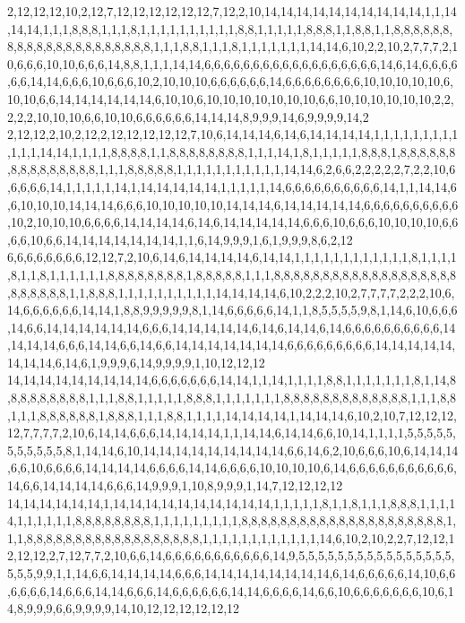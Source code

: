 2,12,12,12,10,2,12,7,12,12,12,12,12,12,7,12,2,10,14,14,14,14,14,14,14,14,14,14,1,1,14,14,14,1,1,1,8,8,8,1,1,1,8,1,1,1,1,1,1,1,1,1,1,8,8,1,1,1,1,1,8,8,8,1,1,8,8,1,1,8,8,8,8,8,8,8,8,8,8,8,8,8,8,8,8,8,8,8,8,8,1,1,1,8,8,1,1,1,8,1,1,1,1,1,1,1,14,14,6,10,2,2,10,2,7,7,7,2,10,6,6,6,10,10,6,6,6,14,8,8,1,1,1,14,14,6,6,6,6,6,6,6,6,6,6,6,6,6,6,6,6,6,6,14,6,14,6,6,6,6,6,6,14,14,6,6,6,10,6,6,6,10,2,10,10,10,6,6,6,6,6,6,14,6,6,6,6,6,6,6,6,10,10,10,10,10,6,10,10,6,6,14,14,14,14,14,14,6,10,10,6,10,10,10,10,10,10,10,6,6,10,10,10,10,10,10,2,2,2,2,2,10,10,10,6,6,10,10,6,6,6,6,6,6,14,14,14,8,9,9,9,14,6,9,9,9,9,14,2
2,12,12,2,10,2,12,2,12,12,12,12,12,7,10,6,14,14,14,6,14,6,14,14,14,14,1,1,1,1,1,1,1,1,1,1,1,1,14,14,1,1,1,1,8,8,8,8,1,1,8,8,8,8,8,8,8,8,1,1,1,14,1,8,1,1,1,1,1,8,8,8,1,8,8,8,8,8,8,8,8,8,8,8,8,8,8,8,1,1,1,8,8,8,8,8,1,1,1,1,1,1,1,1,1,1,1,14,14,6,2,6,6,2,2,2,2,2,7,2,2,10,6,6,6,6,6,14,1,1,1,1,1,14,1,14,14,14,14,14,1,1,1,1,1,14,6,6,6,6,6,6,6,6,6,6,14,1,1,14,14,6,6,10,10,10,14,14,14,6,6,6,10,10,10,10,10,14,14,14,6,14,14,14,14,14,6,6,6,6,6,6,6,6,6,6,10,2,10,10,10,6,6,6,6,14,14,14,14,6,14,6,14,14,14,14,14,6,6,6,10,6,6,6,10,10,10,10,6,6,6,6,10,6,6,14,14,14,14,14,14,14,1,1,6,14,9,9,9,1,6,1,9,9,9,8,6,2,12
6,6,6,6,6,6,6,6,12,12,7,2,10,6,14,6,14,14,14,14,6,14,14,1,1,1,1,1,1,1,1,1,1,1,1,8,1,1,1,1,8,1,1,8,1,1,1,1,1,1,8,8,8,8,8,8,8,8,1,8,8,8,8,8,1,1,1,8,8,8,8,8,8,8,8,8,8,8,8,8,8,8,8,8,8,8,8,8,8,8,8,8,1,1,8,8,8,1,1,1,1,1,1,1,1,1,1,14,14,14,14,6,10,2,2,2,10,2,7,7,7,7,2,2,2,10,6,14,6,6,6,6,6,6,14,14,1,8,8,9,9,9,9,9,8,1,14,6,6,6,6,6,14,1,1,8,5,5,5,5,9,8,1,14,6,10,6,6,6,14,6,6,14,14,14,14,14,14,6,6,6,14,14,14,14,14,6,14,6,14,14,6,14,6,6,6,6,6,6,6,6,6,6,14,14,14,14,6,6,6,14,14,6,6,14,6,6,14,14,14,14,14,14,14,6,6,6,6,6,6,6,6,6,14,14,14,14,14,14,14,14,6,14,6,1,9,9,9,6,14,9,9,9,9,1,10,12,12,12
14,14,14,14,14,14,14,14,14,6,6,6,6,6,6,6,14,14,1,1,14,1,1,1,1,8,8,1,1,1,1,1,1,1,8,1,14,8,8,8,8,8,8,8,8,8,1,1,1,8,8,1,1,1,1,1,8,8,8,1,1,1,1,1,1,1,8,8,8,8,8,8,8,8,8,8,8,8,8,1,1,1,8,8,1,1,1,8,8,8,8,8,8,1,8,8,8,1,1,1,8,8,1,1,1,1,14,14,14,14,1,14,14,14,6,10,2,10,7,12,12,12,12,7,7,7,7,2,10,6,14,14,6,6,6,14,14,14,14,1,1,14,14,6,14,14,6,6,10,14,1,1,1,1,5,5,5,5,5,5,5,5,5,5,5,8,1,14,14,6,10,14,14,14,14,14,14,14,14,14,6,6,14,6,2,10,6,6,6,10,6,14,14,14,6,6,10,6,6,6,6,14,14,14,14,6,6,6,6,14,14,6,6,6,6,10,10,10,10,6,14,6,6,6,6,6,6,6,6,6,6,6,14,6,6,14,14,14,14,6,6,6,14,9,9,9,1,10,8,9,9,9,1,14,7,12,12,12,12
14,14,14,14,14,14,1,14,14,14,14,14,14,14,14,14,14,1,1,1,1,1,8,1,1,8,1,1,1,8,8,8,1,1,1,14,1,1,1,1,1,1,8,8,8,8,8,8,8,8,1,1,1,1,1,1,1,1,1,8,8,8,8,8,8,8,8,8,8,8,8,8,8,8,8,8,8,8,8,8,1,1,1,8,8,8,8,8,8,8,8,8,8,8,8,8,8,8,8,8,8,1,1,1,1,1,1,1,1,1,1,1,1,14,6,10,2,10,2,2,7,12,12,12,12,12,2,7,12,7,7,2,10,6,6,14,6,6,6,6,6,6,6,6,6,6,6,14,9,5,5,5,5,5,5,5,5,5,5,5,5,5,5,5,5,5,5,5,9,9,1,1,14,6,6,14,14,14,14,6,6,6,14,14,14,14,14,14,14,14,6,14,6,6,6,6,6,14,10,6,6,6,6,6,6,14,6,6,6,14,14,6,6,6,14,6,6,6,6,6,6,14,14,6,6,6,6,14,6,6,10,6,6,6,6,6,6,6,10,6,14,8,9,9,9,6,6,9,9,9,9,14,10,12,12,12,12,12,12
